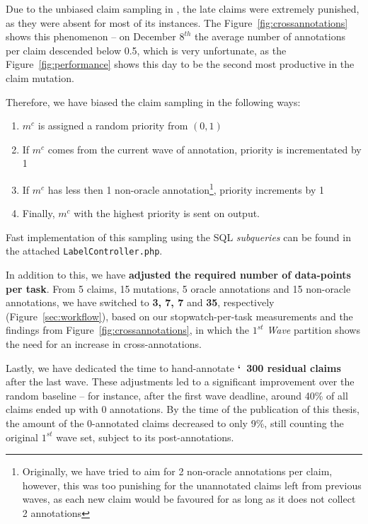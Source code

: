 Due to the unbiased claim sampling in \tdvab{}, the late claims were extremely punished, as they were absent for most of its instances. The Figure~\ref{fig:crossannotations} shows this phenomenon -- on December $8^{th}$ the average number of annotations per claim descended below 0.5, which is very unfortunate, as the Figure~\ref{fig:performance} shows this day to be the second most productive in the claim mutation.

Therefore, we have biased the \tdva{} claim sampling in the following ways:
\begin{enumerate}
    \item $m^c$ is assigned a random priority from $(0,1)$
    \item If $m^c$ comes from the current wave of annotation, priority is incrementated by 1 
    \item If $m^c$ has less then 1 non-oracle annotation\footnote{Originally, we have tried to aim for 2 non-oracle annotations per claim, however, this was too punishing for the unannotated claims left from previous waves, as each new claim would be favoured for as long as it does not collect 2 annotations}, priority increments by 1
    \item Finally, $m^c$ with the highest priority is sent on output.
\end{enumerate}

Fast implementation of this sampling using the \textsf{SQL} \textit{subqueries} can be found in the attached  \texttt{LabelController.php}.

In addition to this, we have \textbf{adjusted the required number of data-points per task}.
From 5 \tjednaa{} claims, 15 \tjednab{} mutations, 5 \tdvaa{} oracle annotations and 15 \tdvab{} non-oracle annotations, we have switched to\textbf{ 3, 7, 7} and \textbf{35}, respectively (Figure~\ref{sec:workflow}), based on our stopwatch-per-task measurements and the findings from Figure~\ref{fig:crossannotations}, in which the $1^{st}$ \textit{Wave} partition shows the need for an increase in cross-annotations.

Lastly, we have dedicated the time to hand-annotate\textbf{ \char`~300 residual claims} after the last wave. These adjustments led to a significant improvement over the random baseline -- for instance, after the first wave deadline, around 40\% of all claims ended up with 0 annotations. By the time of the publication of this thesis, the amount of the 0-annotated claims decreased to only 9\%, still counting the original $1^{st}$ wave set, subject to its post-annotations.


